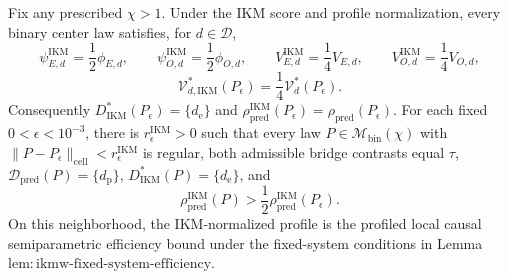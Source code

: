 Fix any prescribed \(\chi>1\). Under the IKM score and profile normalization, every binary center law satisfies, for \(d\in\mathcal D\),
\[
 \psi_{E,d}^{\mathrm{IKM}}=\frac12\phi_{E,d},
 \qquad
 \psi_{O,d}^{\mathrm{IKM}}=\frac12\phi_{O,d},
 \qquad
 V_{E,d}^{\mathrm{IKM}}=\frac14V_{E,d},
 \qquad
 V_{O,d}^{\mathrm{IKM}}=\frac14V_{O,d},
\]
\[
 \mathcal V_{d,\mathrm{IKM}}^*(P_\epsilon)
 =\frac14\mathcal V_d^*(P_\epsilon).
\]
Consequently \(D_{\mathrm{IKM}}^*(P_\epsilon)=\{d_{\mathrm e}\}\) and \(\rho_{\mathrm{pred}}^{\mathrm{IKM}}(P_\epsilon)=\rho_{\mathrm{pred}}(P_\epsilon)\). For each fixed \(0<\epsilon<10^{-3}\), there is \(r_\epsilon^{\mathrm{IKM}}>0\) such that every law \(P\in\mathcal M_{\mathrm{bin}}(\chi)\) with \(\|P-P_\epsilon\|_{\mathrm{cell}}<r_\epsilon^{\mathrm{IKM}}\) is regular, both admissible bridge contrasts equal \(\tau\), \(\mathcal D_{\mathrm{pred}}(P)=\{d_{\mathrm p}\}\), \(D_{\mathrm{IKM}}^*(P)=\{d_{\mathrm e}\}\), and
\[
 \rho_{\mathrm{pred}}^{\mathrm{IKM}}(P)
 >\frac12\rho_{\mathrm{pred}}^{\mathrm{IKM}}(P_\epsilon).
\]
On this neighborhood, the IKM-normalized profile is the profiled local causal semiparametric efficiency bound under the fixed-system conditions in Lemma~\(\mathrm{lem{:}ikmw\text{-}fixed\text{-}system\text{-}efficiency}\).